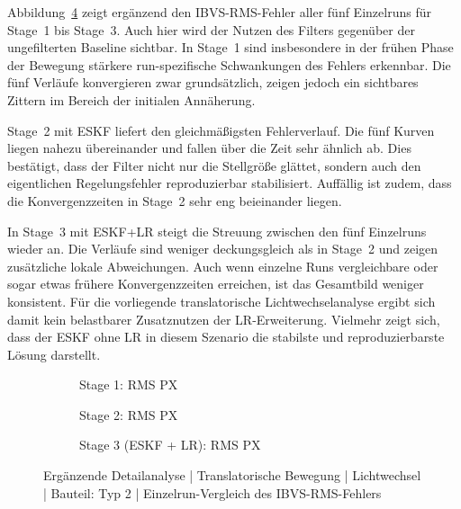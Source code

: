 Abbildung~\ref{fig:c_4_typ2_rms_runs} zeigt ergänzend den \ac{IBVS}-RMS-Fehler aller fünf Einzelruns für Stage~1 bis Stage~3. Auch hier wird der Nutzen des Filters gegenüber der ungefilterten Baseline sichtbar. In Stage~1 sind insbesondere in der frühen Phase der Bewegung stärkere run-spezifische Schwankungen des Fehlers erkennbar. Die fünf Verläufe konvergieren zwar grundsätzlich, zeigen jedoch ein sichtbares Zittern im Bereich der initialen Annäherung.

Stage~2 mit \ac{ESKF} liefert den gleichmäßigsten Fehlerverlauf. Die fünf Kurven liegen nahezu übereinander und fallen über die Zeit sehr ähnlich ab. Dies bestätigt, dass der Filter nicht nur die Stellgröße glättet, sondern auch den eigentlichen Regelungsfehler reproduzierbar stabilisiert. Auffällig ist zudem, dass die Konvergenzzeiten in Stage~2 sehr eng beieinander liegen.

In Stage~3 mit \ac{ESKF}+\ac{LR} steigt die Streuung zwischen den fünf Einzelruns wieder an. Die Verläufe sind weniger deckungsgleich als in Stage~2 und zeigen zusätzliche lokale Abweichungen. Auch wenn einzelne Runs vergleichbare oder sogar etwas frühere Konvergenzzeiten erreichen, ist das Gesamtbild weniger konsistent. Für die vorliegende translatorische Lichtwechselanalyse ergibt sich damit kein belastbarer Zusatznutzen der \ac{LR}-Erweiterung. Vielmehr zeigt sich, dass der \ac{ESKF} ohne \ac{LR} in diesem Szenario die stabilste und reproduzierbarste Lösung darstellt.

\begin{figure}[htbp]
    \centering
    \begin{subfigure}[b]{0.49\textwidth}
        \caption{Stage 1: RMS PX}
        \label{fig:c_1_4_Typ2_ibvs_rms_px}
    \end{subfigure}
    \hfill
    \begin{subfigure}[b]{0.49\textwidth}
        \caption{Stage 2: RMS PX}
        \label{fig:c_2_4_ESKF_Typ2_ibvs_rms_px}
    \end{subfigure}
    \vfill
    \begin{subfigure}[b]{0.49\textwidth}
        \caption{Stage 3 (ESKF + LR): RMS PX}
        \label{fig:c_3_4_ESKF_Typ2_ibvs_rms_px}
    \end{subfigure}
    \caption{Ergänzende Detailanalyse | Translatorische Bewegung | Lichtwechsel | Bauteil: Typ 2 | Einzelrun-Vergleich des \ac{IBVS}-RMS-Fehlers}
    \label{fig:c_4_typ2_rms_runs}
\end{figure}


